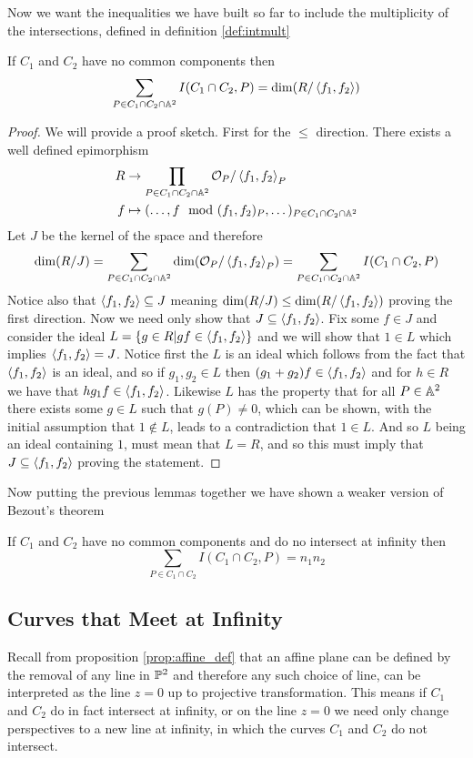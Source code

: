Now we want the inequalities we have built so far to include the multiplicity of the intersections, defined in definition \ref{def:intmult}

\begin{lemma}
    If $C_1$ and $C_2$ have no common components then
    $$\sum_{P\in C_1\cap C_2\cap\A^2}I(C_1\cap C_2,P)=\dim(R/\ip{f_1,f_2})$$
\end{lemma}
\begin{proof}
    We will provide a proof sketch. First for the $\leq$ direction. There exists a well defined epimorphism
    \begin{align*}
        R&\ra \prod_{{P\in C_1\cap C_2\cap\A^2}}\mathcal{O}_P/\ip{f_1,f_2}_P\\
        f&\mapsto (\dots,f \mod (f_1,f_2)_P,\dots)_{P\in C_1\cap C_2\cap\A^2}
    \end{align*}
    Let $J$ be the kernel of the space and therefore 
    $$\dim(R/J)=\sum_{P\in C_1\cap C_2\cap\A^2}\dim(\mathcal{O}_P/\ip{f_1,f_2}_P)=\sum_{P\in C_1\cap C_2\cap\A^2}I(C_1\cap C_2, P)$$
    Notice also that $\ip{f_1,f_2}\se J$ meaning $\dim(R/J)\leq \dim(R/\ip{f_1,f_2})$ proving the first direction. Now we need only show that $J\se\ip{f_1,f_2}$. Fix some $f\in J$ and consider the ideal $L=\{g\in R|gf\in\ip{f_1,f_2}\}$ and we will show that $1\in L$ which implies $\ip{f_1,f_2}= J$. Notice first the $L$ is an ideal which follows from the fact that $\ip{f_1,f_2}$ is an ideal, and so if $g_1,g_2\in L$ then $(g_1+g_2)f\in\ip{f_1,f_2}$ and for $h\in R$ we have that $hg_1f\in \ip{f_1,f_2}$. Likewise $L$ has the property that for all $P\in\A^2$ there exists some $g\in L$ such that $g(P)\neq 0$, which can be shown, with the initial assumption that $1\not\in L$, leads to a contradiction that $1\in L$. And so $L$ being an ideal containing $1$, must mean that $L=R$, and so this must imply that $J\se\ip{f_1,f_2}$ proving the statement.
\end{proof}

Now putting the previous lemmas together we have shown a weaker version of Bezout's theorem
\begin{prop}
\label{prop:almost}
    If $C_1$ and $C_2$ have no common components and do no intersect at infinity then 
    $$\sum_{P\in C_1\cap C_2}I(C_1\cap C_2, P)=n_1n_2$$
\end{prop}

\subsection{Curves that Meet at Infinity}
Recall from proposition \ref{prop:affine_def} that an affine plane can be defined by the removal of any line in $\P^2$ and therefore any such choice of line, can be interpreted as the line $z=0$ up to projective transformation. This means if $C_1$ and $C_2$ do in fact intersect at infinity, or on the line $z=0$ we need only change perspectives to a new line at infinity, in which the curves $C_1$ and $C_2$ do not intersect.

